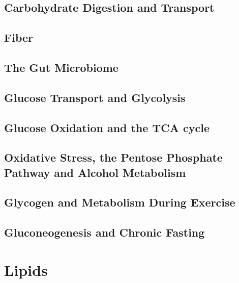 \documentclass{tufte-book}
\begin{document}
\chapter{Carbohydrate Digestion and Transport}\label{ch:carb-digestion}


\chapter{Fiber}\label{ch:fiber}


\chapter{The Gut Microbiome}\label{ch:microbiome}


\chapter{Glucose Transport and Glycolysis}\label{ch:glycolysis}


\chapter{Glucose Oxidation and the TCA cycle}\label{ch:tca-cycle}


\chapter{Oxidative Stress, the Pentose Phosphate Pathway and Alcohol Metabolism}\label{ch:ppp-ethanol}


\chapter{Glycogen and Metabolism During Exercise}\label{ch:glycogen}


\chapter{Gluconeogenesis and Chronic Fasting}\label{ch:gng}


\part{Lipids}
\end{document}
